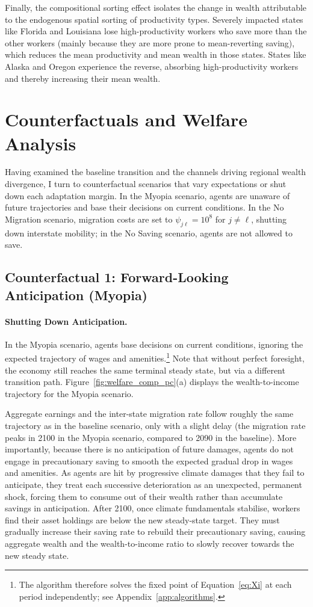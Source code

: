 \documentclass[11pt, a4paper]{article}
\begin{document}
Finally, the compositional sorting effect isolates the change in wealth attributable to the endogenous spatial sorting of productivity types. Severely impacted states like Florida and Louisiana lose high-productivity workers who save more than the other workers (mainly because they are more prone to mean-reverting saving), which reduces the mean productivity and mean wealth in those states. States like Alaska and Oregon experience the reverse, absorbing high-productivity workers and thereby increasing their mean wealth.


\FloatBarrier
\section{Counterfactuals and Welfare Analysis}
\label{sec:counterfactuals}
Having examined the baseline transition and the channels driving regional wealth divergence, I turn to counterfactual scenarios that vary expectations or shut down each adaptation margin. In the Myopia scenario, agents are unaware of future trajectories and base their decisions on current conditions. In the No Migration scenario, migration costs are set to $\psi_{j\ell} = 10^8$ for $j \neq \ell$, shutting down interstate mobility; in the No Saving scenario, agents are not allowed to save.

\subsection{Counterfactual 1: Forward-Looking Anticipation (Myopia)}
\label{sec:myopia}
\paragraph{Shutting Down Anticipation.} In the Myopia scenario, agents base decisions on current conditions, ignoring the expected trajectory of wages and amenities.\footnote{The algorithm therefore solves the fixed point of Equation~\ref{eq:Xi} at each period independently; see Appendix~\ref{app:algorithms}.} Note that without perfect foresight, the economy still reaches the same terminal steady state, but via a different transition path. Figure~\ref{fig:welfare_comp_pc}(a) displays the wealth-to-income trajectory for the Myopia scenario.

Aggregate earnings and the inter-state migration rate follow roughly the same trajectory as in the baseline scenario, only with a slight delay (the migration rate peaks in 2100 in the Myopia scenario, compared to 2090 in the baseline). More importantly, because there is no anticipation of future damages, agents do not engage in precautionary saving to smooth the expected gradual drop in wages and amenities. As agents are hit by progressive climate damages that they fail to anticipate, they treat each successive deterioration as an unexpected, permanent shock, forcing them to consume out of their wealth rather than accumulate savings in anticipation. After 2100, once climate fundamentals stabilise, workers find their asset holdings are below the new steady-state target. They must gradually increase their saving rate to rebuild their precautionary saving, causing aggregate wealth and the wealth-to-income ratio to slowly recover towards the new steady state. 
\end{document}
